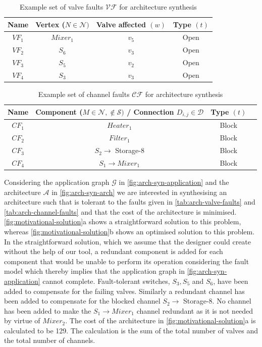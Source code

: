 \begin{table}[H]
\centering
\caption{Example set of valve faults $\mathcal{VF}$ for architecture synthesis}
\begin{tabular}{| c | c | c | c |}
\hline
\textbf{Name} & \textbf{Vertex} ($N \in \mathcal{N})$ & \textbf{Valve affected} $(w)$ & \textbf{Type} $(t)$ \\ \hline
$VF_1$ & $Mixer_1$ & $v_5$ & Open \\ \hline
$VF_2$ & $S_6$ & $v_3$ & Open \\ \hline
$VF_3$ & $S_5$ & $v_2$ & Open \\ \hline
$VF_4$ & $S_3$ & $v_3$ & Open \\ \hline
\end{tabular}
\label{tab:arch-valve-faults}
\end{table}

\begin{table}[H]
\centering
\caption{Example set of channel faults $\mathcal{CF}$ for architecture synthesis}
\begin{tabular}{| c | c | c | c |}
\hline
\textbf{Name} & \textbf{Component} ($M \in \mathcal{N}, \notin \mathcal{S})$ \textbf{/ Connection} $D_{i, j} \in \mathcal{D}$ & \textbf{Type} $(t)$ \\ \hline
$CF_1$ & $Heater_1$ & Block \\ \hline
$CF_2$ & $Filter_1$ & Block \\ \hline
$CF_3$ & $S_2 \rightarrow$ Storage-8 & Block \\ \hline
$CF_4$ & $S_1 \rightarrow Mixer_1$ & Block \\ \hline
\end{tabular}
\label{tab:arch-channel-faults}
\end{table}

Considering the application graph $\mathcal{G}$ in \autoref{fig:arch-syn-application} and the architecture $\mathcal{A}$ in \autoref{fig:arch-syn-arch} we are interested in synthesising an architecture such that is tolerant to the faults given in \autoref{tab:arch-valve-faults} and \autoref{tab:arch-channel-faults} and that the cost of the architecture is minimised.\\
\autoref{fig:motivational-solution}a shows a straightforward solution to this problem, whereas \autoref{fig:motivational-solution}b shows an optimised solution to this problem. In the straightforward solution, which we assume that the designer could create without the help of our tool, a redundant component is added for each component that would be unable to perform its operation considering the fault model which thereby implies that the application graph in \autoref{fig:arch-syn-application} cannot complete. Fault-tolerant switches, $S_3, S_5$ and $S_6$, have been added to compensate for the failing valves. Similarly a redundant channel has been added to compensate for the blocked channel $S_2 \rightarrow$ Storage-8. No channel has been added to make the $S_1 \rightarrow Mixer_1$ channel redundant as it is not needed by virtue of $Mixer_2$. The cost of the architecture in \autoref{fig:motivational-solution}a is calculated to be 129. The calculation is the sum of the total number of valves and the total number of channels.

